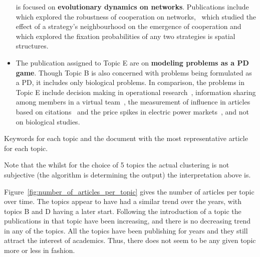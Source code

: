 \documentclass{article}
\theoremstyle{definition}
\begin{document}
\begin{itemize}
    is focused on \textbf{evolutionary dynamics on networks}. Publications include
    \cite{ichinose2013robustness} which explored the robustness of cooperation
    on networks,~\cite{wang2012spatial} which studied the effect of a strategy's neighbourhood
    on the emergence of cooperation and~\cite{chen2016fixation} which explored
    the fixation probabilities of any two strategies is spatial
    structures.
    \item The publication assigned to Topic E are on \textbf{modeling problems
    as a PD game}. Though Topic B is also concerned with problems being formulated
    as a PD, it includes only biological problems. In comparison, the problems
    in Topic E include decision making in
    operational research~\cite{ormerod2010or}, information sharing among members
    in a virtual team~\cite{feng2008trilateral}, the measurement of influence
    in articles based on citations~\cite{hutchins2016relative} and the price
    spikes in electric power markets~\cite{Guan2002}, and not on biological studies.
\end{itemize}

\begin{table}[!hbtp]
    \begin{center}
    \resizebox{\textwidth}{!}{
    }
    \end{center}
    \caption{Keywords for each topic and the document with the most representative article for each topic.}
    \label{table:topics_and_articles}
\end{table}

Note that the whilst for the choice of 5 topics the actual clustering is not
subjective (the algorithm is determining the output) the interpretation above is.

Figure~\ref{fig:number_of_articles_per_topic} gives the number of articles
per topic over time. The topics appear to have had a similar trend over the years,
with topics B and D having a later start. Following the introduction of a topic
the publications in that topic have been increasing, and there is no decreasing
trend in any of the topics. All the topics have been publishing for years and
they still attract the interest of academics. Thus, there does not
seem to be any given topic more or less in fashion.
\end{document}
